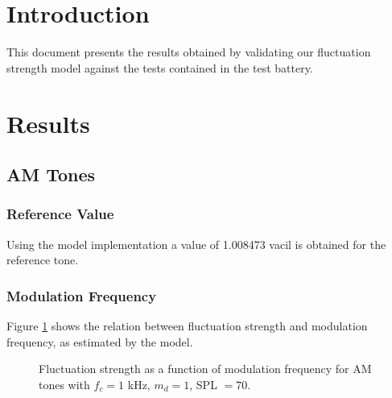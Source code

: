 \documentclass[a4paper]{article}
\begin{document}

\section{Introduction}

This document presents the results obtained by validating our fluctuation
strength model against the tests contained in the test battery.

\section{Results}

\subsection{AM Tones}

\subsubsection{Reference Value}

Using the model implementation a value of 1.008473 vacil is obtained for the
reference tone.

\subsubsection{Modulation Frequency}

Figure \ref{fig:AMtonesfmplot} shows the relation between fluctuation strength
and modulation frequency, as estimated by the model.

\begin{figure}[ht]
    \centering
    \resizebox{!}{8cm}{
        
    }
    \caption{Fluctuation strength as a function of modulation frequency for AM
        tones with $f_c = 1 $ kHz, $m_d = 1$, SPL $= 70$.}
    \label{fig:AMtonesfmplot}
\end{figure}

\custombibliography
\end{document}
